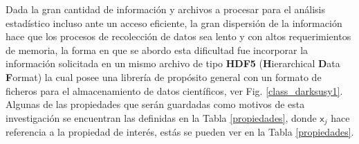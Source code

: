Dada la gran cantidad de información y archivos a procesar para el análisis estadístico incluso ante un acceso eficiente, la gran dispersión de la información hace que los procesos de recolección de datos sea lento y con altos requerimientos de memoria, la forma en que se abordo esta dificultad fue incorporar la información solicitada en un mismo archivo de tipo \textbf{HDF5} (\textbf{H}ierarchical \textbf{D}ata \textbf{F}ormat) la cual posee una librería de propósito general con un formato de ficheros para el almacenamiento de datos científicos, ver Fig. \ref{class_darksusy1}. Algunas de las propiedades que serán guardadas como motivos de esta investigación se encuentran las definidas en la Tabla \ref{propiedades}, donde $\textsf{x}_j$ hace referencia a la propiedad de interés, estás se pueden ver en la Tabla \ref{propiedades}.

